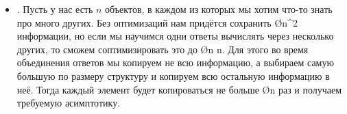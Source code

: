 \begin{itemize}
    \item {}. Пусть у нас есть $n$ объектов, в каждом из которых мы хотим что-то знать про много других. Без оптимизаций нам придётся сохранить \O{n^2} информации, но если мы научимся одни ответы вычислять через несколько других, то сможем соптимизировать это до \O{n \log n}. Для этого во время объединения ответов мы копируем не всю информацию, а выбираем самую большую по размеру структуру и копируем всю остальную информацию в неё. Тогда каждый элемент будет копироваться не больше \O{\log n} раз и получаем требуемую асимптотику.
\end{itemize}
